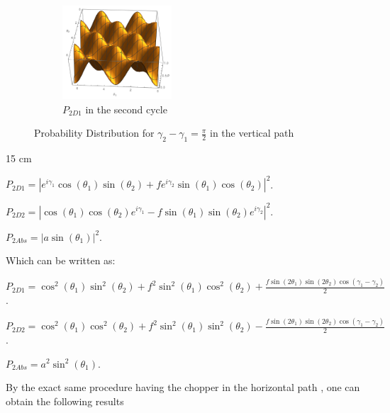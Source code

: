 \documentclass[11pt]{article}
\begin{document}
\begin{figure}[h!]
\begin{subfigure}[b]{0.45\linewidth}
\includegraphics[width=\linewidth,height=3.5cm]{Pc2D12.png}
\caption{$P_{2D1} $ in the second cycle }
\label{fig:BS1}
\end{subfigure}
\caption{Probability Distribution for $\gamma_{2}-\gamma_{1}=\frac{\pi}{2}$ in the vertical path}
\label{fig:westminster}
\end{figure}

\vspace
{15 cm}

 $P_{2D1}=|e^{i\gamma_{1}}\cos(\theta_{1})\sin(\theta_{2})+f e^{i\gamma_{2}}\sin(\theta_{1})\cos(\theta_{2})|^2$.
 
$P_{2D2}=|\cos(\theta_{1})\cos(\theta_{2})e^{i\gamma_{1}}- f \sin(\theta_{1})\sin(\theta_{2})e^{i\gamma_{2}}|^2$.

$P_{2Abs}=|a \sin(\theta_{1})|^2$.

Which can be written as:

$P_{2D1}=\cos^2(\theta_{1})\sin^2(\theta_{2})+f^2 \sin^2(\theta_{1})\cos^2(\theta_{2})+\frac{f \sin(2\theta_{1})\sin(2\theta_{2})\cos(\gamma_{1}-\gamma_{2})}{2}$.

$P_{2D2}=\cos^2(\theta_{1})\cos^2(\theta_{2})+ f^2 \sin^2(\theta_{1})\sin^2(\theta_{2})-\frac{f \sin(2\theta_{1})\sin(2\theta_{2})\cos(\gamma_{1}-\gamma_{2})}{2}$.

$P_{2Abs}=a^2 \sin^2(\theta_{1})$.


By the exact same procedure having the chopper in the horizontal path , one can obtain the following results
 
\end{document}
